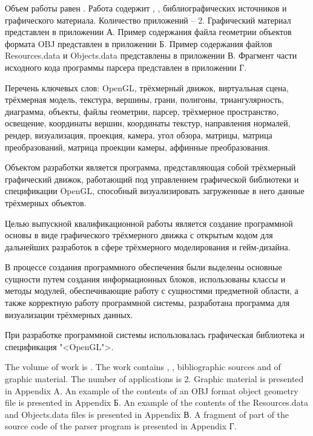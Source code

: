 
Объем работы равен . Работа содержит , ,  библиографических источников и  графического материала. Количество приложений – 2. Графический материал представлен в приложении А. Пример содержания файла геометрии объектов формата OBJ представлен в приложении Б. Пример содержания файлов Resources.data и Objects.data представлены в приложении В.  Фрагмент части исходного кода программы парсера представлен в приложении Г.

Перечень ключевых слов: OpenGL, трёхмерный движок, виртуальная сцена, трёхмерная модель, текстура, вершины, грани, полигоны, триангулярность, диаграмма, объекты, файлы геометрии, парсер, трёхмерное пространство, освещение, координаты вершин, координаты текстур, направления нормалей, рендер, визуализация, проекция, камера, угол обзора, матрицы, матрица преобразований, матрица проекции камеры, аффинные преобразования.

Объектом разработки является программа, представляющая собой трёхмерный графический движок, работающий под управлением графической библиотеки и спецификации OpenGL, способный визуализировать загруженные в него данные трёхмерных объектов.

Целью выпускной квалификационной работы является создание программной основы в виде графического трёхмерного движка с открытым кодом для дальнейших разработок в сфере трёхмерного моделирования и гейм-дизайна.

В процессе создания программного обеспечения были выделены основные сущности путем создания информационных блоков, использованы классы и методы модулей, обеспечивающие работу с сущностями предметной области, а также корректную работу программной системы, разработана программа для визуализации трёхмерных данных.

При разработке программной системы использовалась графическая библиотека и спецификация "<OpenGL">.

  
The volume of work is . The work contains , ,  bibliographic sources and  of graphic material. The number of applications is 2. Graphic material is presented in Appendix A. An example of the contents of an OBJ format object geometry file is presented in Appendix Б. An example of the contents of the Resources.data and Objects.data files is presented in Appendix В. A fragment of part of the source code of the parser program is presented in Appendix Г.

